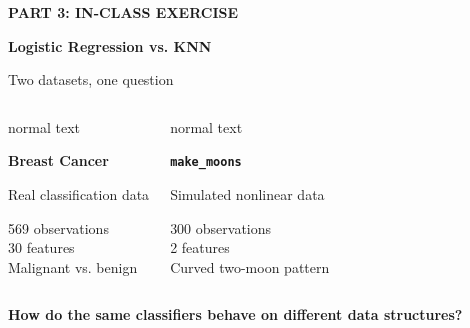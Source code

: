 \documentclass[aspectratio=169,10pt]{beamer}
\newcommand{\datasetbox}[4]{%
  \begin{beamercolorbox}[wd=0.46\textwidth,sep=1.0em,rounded=false,shadow=false]{normal text}
    \colorbox{#1}{\parbox[c][0.43\textheight][c]{0.91\textwidth}{%
      \centering
      {\color{navy}\Large\bfseries #2}\par\vspace{0.75em}
      {\large #3}\par\vspace{0.8em}
      \raggedright\normalsize #4
    }}
  \end{beamercolorbox}%
}
\begin{document}
\begin{frame}
  \vspace{0.35em}
  {\color{coral}\large\bfseries PART 3: IN-CLASS EXERCISE}\par\vspace{0.35em}
  {\color{navy}\Huge\bfseries Logistic Regression vs. KNN}\par\vspace{0.35em}
  {\large Two datasets, one question}\par\vspace{1.0em}

  \begin{columns}[T,onlytextwidth]
    \datasetbox{mint}{Breast Cancer}{Real classification data}{569 observations\\30 features\\Malignant vs. benign}
    \datasetbox{warm}{\texttt{make\_moons}}{Simulated nonlinear data}{300 observations\\2 features\\Curved two-moon pattern}
  \end{columns}

  \vfill
  \begin{center}
    \parbox{0.88\textwidth}{\centering\color{navy}\Large\bfseries How do the same classifiers behave on different data structures?}
  \end{center}
\end{frame}
\end{document}
